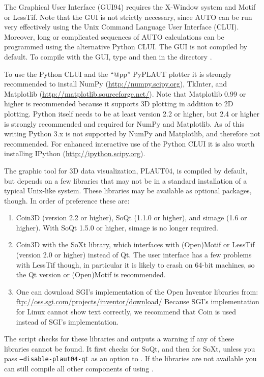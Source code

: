 \documentclass[12pt]{report}
\begin{document}
The Graphical User Interface (GUI94) requires the {\cal X-Window} system
and {\cal Motif} or {\cal LessTif}.
Note that the GUI is not strictly necessary, since {\cal AUTO} can be
run very effectively using the Unix Command Language User Interface (CLUI).
Moreover, long or complicated sequences of {\cal AUTO} calculations can
be programmed using the alternative Python CLUI. 
The GUI is not compiled by default. To compile
\AUTO with the GUI, type 
and then  in the directory .

To use the Python CLUI and the ``@pp'' {\cal PyPLAUT} plotter it
is strongly recommended to install NumPy
(\url{http://numpy.scipy.org}), TkInter, and
Matplotlib (\url{http://matplotlib.sourceforge.net/}).
Note that Matplotlib 0.99 or higher is recommended because it supports
3D plotting in addition to 2D plotting.
Python itself needs to be at least version 2.2 or higher, but 2.4 or
higher is strongly recommended and required for NumPy and Matplotlib.
As of this writing Python 3.x is not supported by NumPy and
Matplotlib, and therefore not recommended.
For enhanced interactive use of the Python CLUI it is also worth
installing IPython (\url{http://ipython.scipy.org}).

The graphic tool for 3D \AUTO data visualization, {\cal PLAUT04}, is
compiled by default, but depends on a few libraries that may not be
in a standard installation of a typical Unix-like
system. These libraries may be available as optional packages,
though. In order of preference these are:
\begin{enumerate}
\item
Coin3D (version 2.2 or higher), SoQt (1.1.0 or higher), and simage
(1.6 or higher). With SoQt 1.5.0 or higher, simage is no longer required.
\item
Coin3D with the SoXt library, which interfaces with (Open)Motif or
LessTif (version 2.0 or higher) instead of Qt. The user interface has
a few problems with LessTif though, in particular it is likely to
crash on 64-bit machines, so the Qt version or (Open)Motif is
recommended.
\item
One can download SGI's implementation of the
Open Inventor libraries from:
\url{ftp://oss.sgi.com/projects/inventor/download/}
Because SGI's implementation for Linux cannot show text correctly, 
we recommend that Coin is used instead of SGI's implementation. 
\end{enumerate}

The  script checks
for these libraries and outputs a warning if any of these libraries
cannot be found. It first checks for SoQt, and then for SoXt, unless
you pass {\tt --disable-plaut04-qt} as an option to .
If the libraries are not available you can still compile
all other components of \AUTO using .
\end{document}
